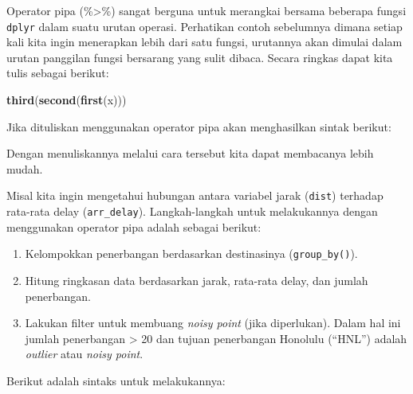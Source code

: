 \documentclass[]{book}
\newenvironment{Shaded}{\begin{snugshade}}{\end{snugshade}}
\newcommand{\KeywordTok}[1]{\textcolor[rgb]{0.13,0.29,0.53}{\textbf{#1}}}
\newcommand{\StringTok}[1]{\textcolor[rgb]{0.31,0.60,0.02}{#1}}
\newcommand{\OperatorTok}[1]{\textcolor[rgb]{0.81,0.36,0.00}{\textbf{#1}}}
\newcommand{\NormalTok}[1]{#1}
\providecommand{\tightlist}{%
  \setlength{\itemsep}{0pt}\setlength{\parskip}{0pt}}
\begin{document}
Operator pipa (\%\textgreater{}\%) sangat berguna untuk merangkai
bersama beberapa fungsi \texttt{dplyr} dalam suatu urutan operasi.
Perhatikan contoh sebelumnya dimana setiap kali kita ingin menerapkan
lebih dari satu fungsi, urutannya akan dimulai dalam urutan panggilan
fungsi bersarang yang sulit dibaca. Secara ringkas dapat kita tulis
sebagai berikut:

\begin{Shaded}
\begin{Highlighting}[]
\KeywordTok{third}\NormalTok{(}\KeywordTok{second}\NormalTok{(}\KeywordTok{first}\NormalTok{(x)))}
\end{Highlighting}
\end{Shaded}

Jika dituliskan menggunakan operator pipa akan menghasilkan sintak
berikut:

\begin{Shaded}
\end{Shaded}

Dengan menuliskannya melalui cara tersebut kita dapat membacanya lebih
mudah.

Misal kita ingin mengetahui hubungan antara variabel jarak
(\texttt{dist}) terhadap rata-rata delay (\texttt{arr\_delay}).
Langkah-langkah untuk melakukannya dengan menggunakan operator pipa
adalah sebagai berikut:

\begin{enumerate}
\def\labelenumi{\arabic{enumi}.}
\tightlist
\item
  Kelompokkan penerbangan berdasarkan destinasinya
  (\texttt{group\_by()}).
\item
  Hitung ringkasan data berdasarkan jarak, rata-rata delay, dan jumlah
  penerbangan.
\item
  Lakukan filter untuk membuang \emph{noisy point} (jika diperlukan).
  Dalam hal ini jumlah penerbangan \textgreater{} 20 dan tujuan
  penerbangan Honolulu (``HNL'') adalah \emph{outlier} atau \emph{noisy
  point}.
\end{enumerate}

Berikut adalah sintaks untuk melakukannya:
\end{document}
